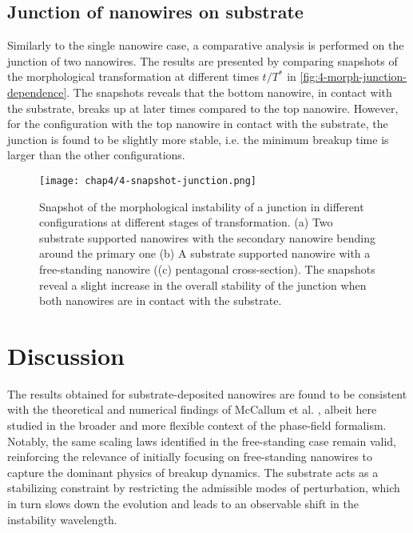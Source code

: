 \subsection{Junction of nanowires on substrate}
Similarly to the single nanowire case, a comparative analysis is performed on the junction of two nanowires. The results are presented by comparing snapshots of the morphological transformation at different times $t/T^*$ in \autoref{fig:4-morph-junction-dependence}. The snapshots reveals that the bottom nanowire, in contact with the substrate, breaks up at later times compared to the top nanowire. However, for the configuration with the top nanowire in contact with the substrate, the junction is found to be slightly more stable, i.e. the minimum breakup time is larger than the other configurations. 
\begin{figure}[H]
    \centering
    \texttt{[image: chap4/4-snapshot-junction.png]}
    \caption{Snapshot of the morphological instability of a junction in different configurations at different stages of transformation. (a) Two substrate supported nanowires with the secondary nanowire bending around the primary one (b) A substrate supported nanowire with a free-standing nanowire ((c) pentagonal cross-section). The snapshots reveal a slight increase in the overall stability of the junction when both nanowires are in contact with the substrate. }
    \label{fig:4-morph-junction-dependence}
\end{figure}

\section{Discussion}
The results obtained for substrate-deposited nanowires are found to be consistent with the theoretical and numerical findings of McCallum et al. \cite{McCallumVoorheesMiksisDavisWong1996}, albeit here studied in the broader and more flexible context of the phase-field formalism. Notably, the same scaling laws identified in the free-standing case remain valid, reinforcing the relevance of initially focusing on free-standing nanowires to capture the dominant physics of breakup dynamics. The substrate acts as a stabilizing constraint by restricting the admissible modes of perturbation, which in turn slows down the evolution and leads to an observable shift in the instability wavelength.

